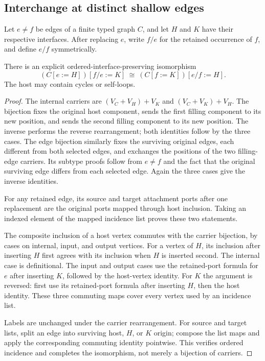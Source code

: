 \subsection{Interchange at distinct shallow edges}
Let $e\ne f$ be edges of a finite typed graph $C$, and let $H$ and $K$
have their respective interfaces. After replacing $e$, write $f/e$ for
the retained occurrence of $f$, and define $e/f$ symmetrically.
\begin{theorem}
There is an explicit ordered-interface-preserving isomorphism
\[
       (C[e:=H])[f/e:=K]\ \cong\ (C[f:=K])[e/f:=H].
\]
The host may contain cycles or self-loops.
\end{theorem}
\begin{proof}
The internal carriers are $(V_C+V_H)+V_K$ and $(V_C+V_K)+V_H$.
The bijection fixes the original host component, sends the first filling
component to its new position, and sends the second filling component to
its new position. The inverse performs the reverse rearrangement;
both identities follow by the three cases.
The edge bijection similarly fixes the surviving original edges, each
different from both selected edges, and exchanges the positions of the
two filling-edge carriers. Its subtype proofs follow from $e\ne f$ and
the fact that the original surviving edge differs from each selected edge.
Again the three cases give the inverse identities.

For any retained edge, its source and target attachment ports after one
replacement are the original ports mapped through host inclusion.
Taking an indexed element of the mapped incidence list proves these
two statements.

The composite inclusion of a host vertex commutes with the carrier
bijection, by cases on internal, input, and output vertices.
For a vertex of $H$, its inclusion after inserting $H$ first agrees with
its inclusion when $H$ is inserted second. The internal case is
definitional. The input and output cases use the retained-port formula
for $e$ after inserting $K$, followed by the host-vertex identity.
For $K$ the argument is reversed: first use its retained-port formula
after inserting $H$, then the host identity. These three commuting maps
cover every vertex used by an incidence list.

Labels are unchanged under the carrier rearrangement. For source and
target lists, split an edge into surviving host, $H$, or $K$ origin;
compose the list maps and apply the corresponding commuting identity
pointwise. This verifies ordered incidence and completes the
isomorphism, not merely a bijection of carriers.
\end{proof}

